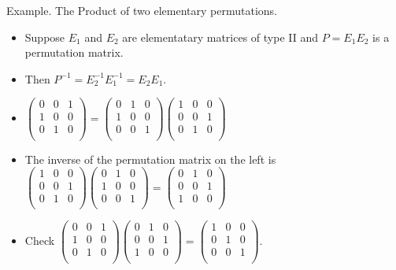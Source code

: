 \documentclass{beamer}
\begin{document}
\begin{frame}{Example. The Product of two elementary permutations.}

\begin{itemize}
\item Suppose $E_1$ and $E_2$ are elementatary matrices of type II and
$P=E_1 E_2$ is a permutation matrix.
\item Then $P^{-1} = E_2^{-1} E_1^{-1} = E_2 E_1$.
\item $
\begin{pmatrix}
0 & 0 & 1 \\
1 & 0 & 0 \\
0 & 1 & 0 \\
\end{pmatrix}
=
\begin{pmatrix}
0 & 1 & 0 \\
1 & 0 & 0 \\
0 & 0 & 1 \\
\end{pmatrix}
\begin{pmatrix}
1 & 0 & 0 \\
0 & 0 & 1 \\
0 & 1 & 0 \\
\end{pmatrix}
$
\item The inverse of the permutation matrix on the left is
$
\begin{pmatrix}
1 & 0 & 0 \\
0 & 0 & 1 \\
0 & 1 & 0 \\
\end{pmatrix}
\begin{pmatrix}
0 & 1 & 0 \\
1 & 0 & 0 \\
0 & 0 & 1 \\
\end{pmatrix}=
\begin{pmatrix}
0 & 1 & 0 \\
0 & 0 & 1 \\
1 & 0 & 0 \\
\end{pmatrix}
$
\item Check
$
\begin{pmatrix}
0 & 0 & 1 \\
1 & 0 & 0 \\
0 & 1 & 0 \\
\end{pmatrix}
\begin{pmatrix}
0 & 1 & 0 \\
0 & 0 & 1 \\
1 & 0 & 0 \\
\end{pmatrix}=
\begin{pmatrix}
1 & 0 & 0 \\
0 & 1 & 0 \\
0 & 0 & 1 \\
\end{pmatrix}.
$
\end{itemize}
\end{frame}
\end{document}
